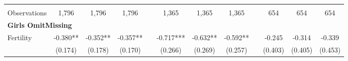 \begin{landscape}
\begin{table}[htpb!]
\begin{center}
\begin{tabular}{lcccp{2mm}cccp{2mm}ccc}
\begin{footnotesize}\end{footnotesize}&\begin{footnotesize}\end{footnotesize}&\begin{footnotesize}\end{footnotesize}&\begin{footnotesize}\end{footnotesize}&\begin{footnotesize}\end{footnotesize}&\begin{footnotesize}\end{footnotesize}&\begin{footnotesize}\end{footnotesize}&\begin{footnotesize}\end{footnotesize}&\begin{footnotesize}\end{footnotesize}&\begin{footnotesize}\end{footnotesize}&\begin{footnotesize}\end{footnotesize}&\begin{footnotesize}\end{footnotesize}\\Observations&1,796&1,796&1,796&&1,365&1,365&1,365&&654&654&654\\
\multicolumn{12}{l}{\textbf{Girls OmitMissing}}\\ 
Fertility&-0.380**&-0.352**&-0.357**&&-0.717***&-0.632**&-0.592**&&-0.245&-0.314&-0.339\\
&(0.174)&(0.178)&(0.170)&&(0.266)&(0.269)&(0.257)&&(0.403)&(0.405)&(0.453)\\

\end{tabular}
\end{center}
\end{table}
\end{landscape}
